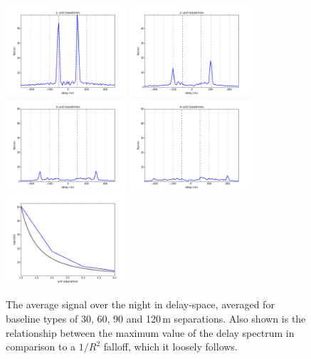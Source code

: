 \documentclass[10pt,a4paper,notitlepage]{article}
\begin{document}
\begin{figure}
\centering
\includegraphics[width=0.4\textwidth]{xx_1unit_xtalk_d.png}
\includegraphics[width=0.4\textwidth]{xx_2unit_xtalk_d.png}
\includegraphics[width=0.4\textwidth]{xx_3unit_xtalk_d.png}
\includegraphics[width=0.4\textwidth]{xx_4unit_xtalk_d.png}
\includegraphics[width=0.4\textwidth]{max.png}
\caption{The average signal over the night in delay-space, averaged for baseline types of 30, 60, 90 and 120\,m separations. Also shown is the relationship between the maximum value of the delay spectrum in comparison to a $1/R^2$ falloff, which it loosely follows.}
\label{fig:the-money-plot}
\end{figure}
\end{document}
